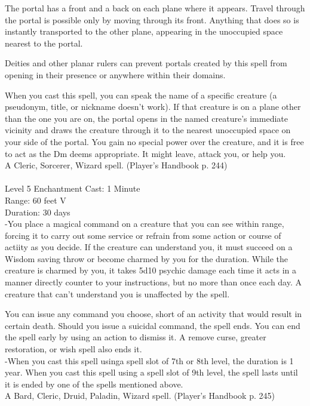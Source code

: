 \documentclass[10pt,twocolumn]{report}
\begin{document}
The portal has a front and a back on each plane where it appears. Travel through the portal is possible only by moving through its front. Anything that does so is instantly transported to the other plane, appearing in the unoccupied space nearest to the portal.

Deities and other planar rulers can prevent portals created by this spell from opening in their presence or anywhere within their domains.

When you cast this spell, you can speak the name of a specific creature (a pseudonym, title, or nickname doesn’t work). If that creature is on a plane other than the one you are on, the portal opens in the named creature’s immediate vicinity and draws the creature through it to the nearest unoccupied space on your side of the portal. You gain no special power over the creature, and it is free to act as the Dm deems appropriate. It might leave, attack you, or help you.\\
A Cleric, Sorcerer, Wizard spell. (Player's Handbook p. 244) \\


 \\
Level 5 \quad Enchantment \quad Cast: 1 Minute\\
Range: 60 feet \quad V\\
Duration: 30 days \quad \\
-You place a magical command on a creature that you can see within range, forcing it to carry out some service or refrain from some action or course of actiity as you decide.
If the creature can understand you, it must succeed on a Wisdom saving throw or become charmed by you for the duration. While the creature is charmed by you, it takes 5d10 psychic damage each time it acts in a manner directly counter to your instructions, but no more than once each day. A creature that can’t understand you is unaffected by the spell.

You can issue any command you choose, short of an activity that would result in certain death. Should you issue a suicidal command, the spell ends. You can end the spell early by using an action to dismiss it. A remove curse, greater restoration, or wish spell also ends it.\\
-When you cast this spell usinga spell slot of 7th or 8th level, the duration is 1 year.
When you cast this spell using a spell slot of 9th level, the spell lasts until it is ended by one of the spells mentioned above.\\
A Bard, Cleric, Druid, Paladin, Wizard spell. (Player's Handbook p. 245) \\
\end{document}
